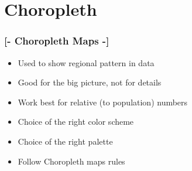 \documentclass[xcolor=x11names,aspectratio=169, compress]{beamer}
\renewcommand{\(}{\begin{columns}}
\renewcommand{\)}{\end{columns}}
\newcommand{\<}[1]{\begin{column}{#1}}
\renewcommand{\>}{\end{column}}
\begin{document}
\begin{frame}
\begin{columns}
    \end{columns}
\end{frame}

\section{Choropleth}

\begin{frame} %
\frametitle{\textcolor{brique}{[-  \textbf{Choropleth Maps} -]}}
\begin{itemize}[<+-|alert@+>]
    \item  Used to show regional pattern in data   %
    \item  Good for the big picture, not for details
    \item  Work best for relative (to population) numbers
    \item  Choice of the right color scheme
    \item  Choice of the right palette %
    \item  Follow Choropleth maps rules %
\end{itemize}
\end{frame}
\end{document}
